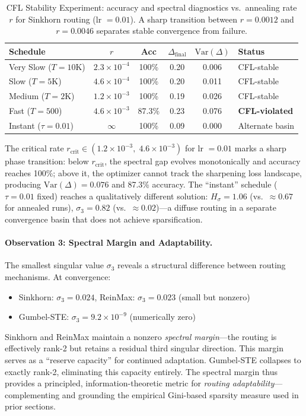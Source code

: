 \documentclass[Royal,times,sageh]{sagej}
\begin{document}
\begin{table}[h]
\centering
\caption{CFL Stability Experiment: accuracy and spectral diagnostics vs.\ annealing rate $r$ for Sinkhorn routing (lr $= 0.01$). A sharp transition between $r = 0.0012$ and $r = 0.0046$ separates stable convergence from failure.}
\label{tab:cfl_stability}
\small
\begin{tabular}{lccccl}
\toprule
\textbf{Schedule} & $r$ & \textbf{Acc} & $\Delta_\text{final}$ & $\text{Var}(\Delta)$ & \textbf{Status} \\
\midrule
Very Slow ($T{=}10$K) & $2.3 \times 10^{-4}$ & 100\% & 0.20 & 0.006 & CFL-stable \\
Slow ($T{=}5$K)       & $4.6 \times 10^{-4}$ & 100\% & 0.20 & 0.011 & CFL-stable \\
Medium ($T{=}2$K)     & $1.2 \times 10^{-3}$ & 100\% & 0.19 & 0.026 & CFL-stable \\
Fast ($T{=}500$)      & $4.6 \times 10^{-3}$ & 87.3\% & 0.23 & 0.076 & \textbf{CFL-violated} \\
Instant ($\tau{=}0.01$) & $\infty$ & 100\% & 0.09 & 0.000 & Alternate basin \\
\bottomrule
\end{tabular}
\end{table}

The critical rate $r_\text{crit} \in (1.2 \times 10^{-3},\; 4.6 \times 10^{-3})$ for lr $= 0.01$ marks a sharp phase transition: below $r_\text{crit}$, the spectral gap evolves monotonically and accuracy reaches 100\%; above it, the optimizer cannot track the sharpening loss landscape, producing $\text{Var}(\Delta) = 0.076$ and 87.3\% accuracy. The ``instant'' schedule ($\tau = 0.01$ fixed) reaches a qualitatively different solution: $H_\sigma = 1.06$ (vs.\ $\approx 0.67$ for annealed runs), $\sigma_3 = 0.82$ (vs.\ $\approx 0.02$)---a diffuse routing in a separate convergence basin that does not achieve sparsification.

\paragraph{Observation 3: Spectral Margin and Adaptability.}

The smallest singular value $\sigma_3$ reveals a structural difference between routing mechanisms. At convergence:
\begin{itemize}
    \item Sinkhorn: $\sigma_3 = 0.024$, ReinMax: $\sigma_3 = 0.023$ (small but nonzero)
    \item Gumbel-STE: $\sigma_3 = 9.2 \times 10^{-9}$ (numerically zero)
\end{itemize}
Sinkhorn and ReinMax maintain a nonzero \textit{spectral margin}---the routing is effectively rank-2 but retains a residual third singular direction. This margin serves as a ``reserve capacity'' for continued adaptation. Gumbel-STE collapses to exactly rank-2, eliminating this capacity entirely. The spectral margin thus provides a principled, information-theoretic metric for \textit{routing adaptability}---complementing and grounding the empirical Gini-based sparsity measure used in prior sections.
\end{document}

